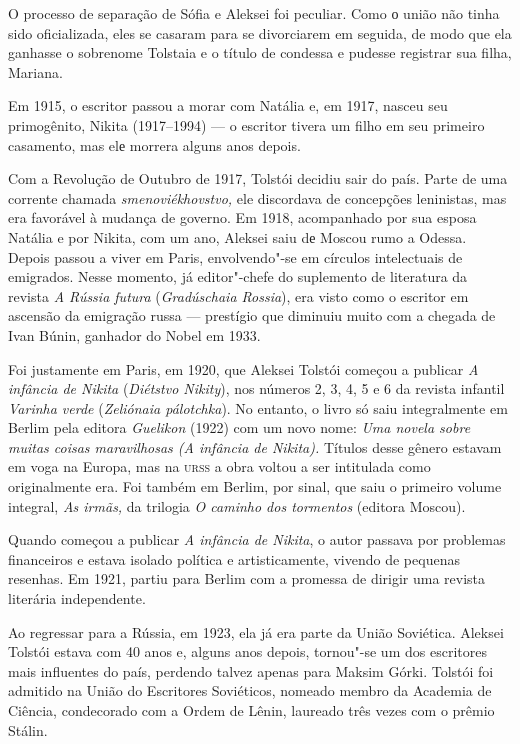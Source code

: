 O processo de separação de Sófia e Aleksei foi peculiar. Como о união
não tinha sido oficializada, eles se casaram para se divorciarem em
seguida, de modo que ela ganhasse o sobrenome Tolstaia e o título de
condessa e pudesse registrar sua filha, Mariana.

Em 1915, o escritor passou a morar com Natália e, em 1917, nasceu seu
primogênito, Nikita (1917--1994) --- o escritor tivera um filho em seu
primeiro casamento, mas elе morrera alguns anos depois.

Com a Revolução de Outubro de 1917, Tolstói decidiu sair do país. Parte
de uma corrente chamada \emph{smenoviékhovstvo,} ele discordava de
concepções leninistas, mas era favorável à mudança de governo. Em 1918,
acompanhado por sua esposa Natália e por Nikita, com um ano, Aleksei
saiu dе Moscou rumo a Odessa. Depois passou a viver em Paris,
envolvendo"-se em círculos intelectuais de emigrados. Nesse momento, já
editor"-chefe do suplemento de literatura da revista \emph{A Rússia
futura} (\emph{Gradúschaia Rossia}), era visto como o escritor em
ascensão da emigração russa --- prestígio que diminuiu muito com a
chegada de Ivan Búnin, ganhador do Nobel em 1933.

Foi justamente em Paris, em 1920, que Aleksei Tolstói começou a publicar
\emph{A infância de Nikita} (\emph{Diétstvo Nikity}), nos números 2, 3,
4, 5 e 6 da revista infantil \emph{Varinha verde} (\emph{Zeliónaia
pálotchka}). No entanto, o livro só saiu integralmente em Berlim pela
editora \emph{Guelikon} (1922) com um novo nome: \emph{Uma novela sobre
muitas coisas maravilhosas (A infância de Nikita).} Títulos desse gênero
estavam em voga na Europa, mas na \textsc{urss} a obra voltou a ser intitulada
como originalmente era. Foi também em Berlim, por sinal, que saiu o
primeiro volume integral, \emph{As irmãs,} da trilogia \emph{O caminho
dos tormentos} (editora Moscou).

Quando começou a publicar \emph{A infância de Nikita}, o autor passava
por problemas financeiros e estava isolado política e artisticamente,
vivendo de pequenas resenhas. Em 1921, partiu para Berlim com a promessa
de dirigir uma revista literária independente.

Ao regressar para a Rússia, em 1923, ela já era parte da União
Soviética. Aleksei Tolstói estava com 40 anos e, alguns anos depois,
tornou"-se um dos escritores mais influentes do país, perdendo talvez
apenas para Maksim Górki. Tolstói foi admitido na União do Escritores
Soviéticos, nomeado membro da Academia de Ciência, condecorado com a
Ordem de Lênin, laureado três vezes com o prêmio Stálin.

